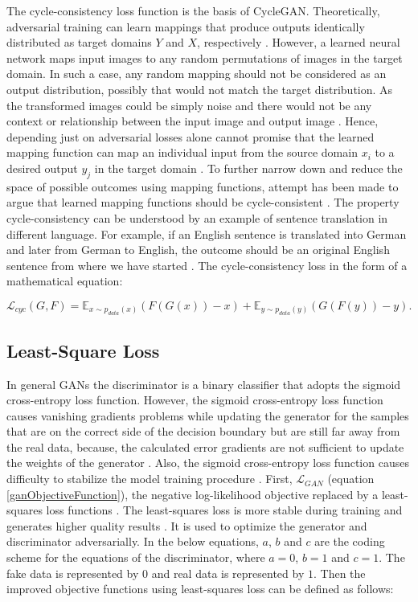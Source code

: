 The cycle-consistency loss function is the basis of \ac{CycleGAN}. Theoretically, adversarial training can learn mappings that produce outputs identically distributed as target domains $Y$ and $X$, respectively \cite{goodfellow2017nips}. However, a learned neural network maps input images to any random permutations of images in the target domain. In such a case, any random mapping should not be considered as an output distribution, possibly that would not match the target distribution. As the transformed images could be simply noise and there would not be any context or relationship between the input image and output image \cite{zhu2020unpaired} \cite{goodfellow2017nips}. Hence, depending just on adversarial losses alone cannot promise that the learned mapping function can map an individual input from the source domain $x_i$ to a desired output $y_j$ in the target domain \cite{goodfellow2017nips}. To further narrow down and reduce the space of possible outcomes using mapping functions, attempt has been made to argue that learned mapping functions should be cycle-consistent \cite{zhu2020unpaired}. The property cycle-consistency can be understood by an example of sentence translation in different language. For example, if an English sentence is translated into German and later from German to English, the outcome should be an original English sentence from where we have started \cite{goodfellow2017nips}. The cycle-consistency loss in the form of a mathematical equation:

\begin{equation}\label{CycleConsistencyLossEquation}
    \mathcal{L}_{cyc}(G, F) = \mathbb{E}_{x \sim p_{data}(x)} (F(G(x)) - x) + \mathbb{E}_{y \sim p_{data}(y)} (G(F(y)) - y).
\end{equation}


\subsection{Least-Square Loss}

In general \acp{GAN} the discriminator is a binary classifier that adopts the sigmoid cross-entropy loss function. However, the sigmoid cross-entropy loss function causes vanishing gradients problems while updating the generator for the samples that are on the correct side of the decision boundary but are still far away from the real data, because, the calculated error gradients are not sufficient to update the weights of the generator \cite{mao2017squares}.  Also, the sigmoid cross-entropy loss function causes difficulty to stabilize the model training procedure \cite{mao2017squares}. First, $\mathcal{L}_{GAN}$ (equation \ref{ganObjectiveFunction}), the negative log-likelihood objective replaced by a least-squares loss functions \cite{mao2017squares}. The least-squares loss is more stable during training and generates higher quality results \cite{mao2017squares}. It is used to optimize the generator and discriminator adversarially. In the below equations, $a$, $b$ and $c$ are the coding scheme for the equations of the discriminator, where $a = 0$, $b = 1$ and $c = 1$. The fake data is represented by $0$ and real data is represented by $1$. Then the improved objective functions using least-squares loss can be defined as follows:


